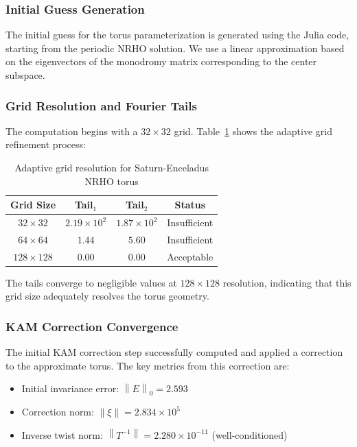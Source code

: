 \documentclass[review,onefignum,onetabnum]{siamart220329}
\newcommand{\norm}[1]{\left\|#1\right\|}
\begin{document}
\subsubsection{Initial Guess Generation}

The initial guess for the torus parameterization is generated using the Julia
code, starting from the periodic NRHO solution. We use a linear approximation
based on the eigenvectors of the monodromy matrix corresponding to the center
subspace.

\subsubsection{Grid Resolution and Fourier Tails}

The computation begins with a $32 \times 32$ grid. Table~\ref{tab:grid_progression}
shows the adaptive grid refinement process:

\begin{table}[h]
\centering
\caption{Adaptive grid resolution for Saturn-Enceladus NRHO torus}
\label{tab:grid_progression}
\begin{tabular}{@{}cccc@{}}
\toprule
Grid Size & Tail$_1$ & Tail$_2$ & Status \\
\midrule
$32 \times 32$   & $2.19 \times 10^{2}$ & $1.87 \times 10^{2}$ & Insufficient \\
$64 \times 64$   & $1.44$               & $5.60$               & Insufficient \\
$128 \times 128$ & $0.00$               & $0.00$               & Acceptable \\
\bottomrule
\end{tabular}
\end{table}

The tails converge to negligible values at $128 \times 128$ resolution, indicating
that this grid size adequately resolves the torus geometry.

\subsubsection{KAM Correction Convergence}

The initial KAM correction step successfully computed and applied a correction
to the approximate torus. The key metrics from this correction are:

\begin{itemize}
    \item Initial invariance error: $\norm{E}_0 = 2.593$
    \item Correction norm: $\norm{\xi} = 2.834 \times 10^5$
    \item Inverse twist norm: $\norm{T^{-1}} = 2.280 \times 10^{-11}$
          (well-conditioned)
\end{itemize}
\end{document}

